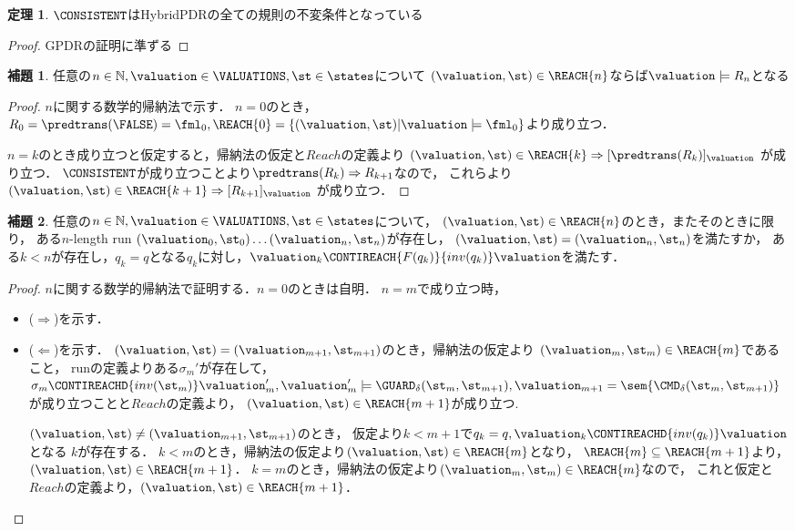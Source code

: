 \documentclass[a4paper]{jarticle}
\theoremstyle{definition}
\newtheorem{theorem}{定理}
\newtheorem{lemma}{補題}
\begin{document}
\begin{theorem}
  $\CONSISTENT$はHybridPDRの全ての規則の不変条件となっている
\end{theorem}

\begin{proof}
  GPDRの証明に準ずる
\end{proof}

\begin{lemma} \label{lem:1}
  任意の$n \in \mathbb{N}, \valuation \in \VALUATIONS, \st \in \states$について
  $(\valuation, \st) \in \REACH{n}$ならば$\valuation \models R_n$となる
\end{lemma}

\begin{proof}
  $n$に関する数学的帰納法で示す．
  $n=0$のとき，$R_0 = \predtrans(\FALSE) = \fml_0, \REACH{0} = \{(\valuation, \st) | \valuation \models \fml_0 \}$より成り立つ．

  $n=k$のとき成り立つと仮定すると，帰納法の仮定と$\mathit{Reach}$の定義より
  $(\valuation,\st) \in \REACH{k} \Rightarrow [\predtrans(R_k)]_{\valuation}$
  が成り立つ．
  $\CONSISTENT$が成り立つことより$\predtrans(R_k) \Rightarrow R_{k+1}$なので，
  これらより$(\valuation,\st) \in \REACH{k+1} \Rightarrow [R_{k+1}]_\valuation$
  が成り立つ．
\end{proof}

\begin{lemma} \label{lem:2}
  任意の$n \in \mathbb{N}, \valuation \in \VALUATIONS, \st \in \states$について，
  $(\valuation,\st) \in \REACH{n}$のとき，またそのときに限り，
  ある$n$-length run $(\valuation_0,\st_0) \dots (\valuation_n, \st_n)$が存在し，
  $(\valuation, \st) = (\valuation_n, \st_n)$を満たすか，
  ある$k < n$が存在し，$q_k = q$となる$q_k$に対し，$\valuation_k \CONTIREACH{F(q_k)}{ inv(q_k)} \valuation$を満たす．
\end{lemma}

\begin{proof}
  $n$に関する数学的帰納法で証明する．$n=0$のときは自明．
  $n=m$で成り立つ時，
  \begin{itemize}
  \item ($\Rightarrow$)を示す．
  \item ($\Leftarrow$)を示す．
    $(\valuation,\st) = (\valuation_{m+1}, \st_{m+1})$のとき，帰納法の仮定より
    $(\valuation_m,\st_m) \in \REACH{m}$であること，
    runの定義よりある$\sigma_m'$が存在して，$\sigma_m \CONTIREACHD{inv(\st_m)} \valuation_m', \valuation_m' \models \GUARD_\delta(\st_m,\st_{m+1}), \valuation_{m+1} = \sem{\CMD_\delta(\st_m,\st_{m+1})}$が成り立つことと$\mathit{Reach}$の定義より，
    $(\valuation,\st) \in \REACH{m+1}$が成り立つ.

    $(\valuation,\st) \not= (\valuation_{m+1},\st_{m+1})$のとき，
    仮定より$k<m+1$で$q_k=q,\valuation_k \CONTIREACHD{inv(q_k)} \valuation$となる
    $k$が存在する．
    $k < m$のとき，帰納法の仮定より$(\valuation,\st) \in \REACH{m}$となり，
    $\REACH{m} \subseteq \REACH{m+1}$より，$(\valuation,\st) \in \REACH{m+1}$．
    $k = m$のとき，帰納法の仮定より$(\valuation_m,\st_m) \in \REACH{m}$なので，
    これと仮定と$\mathit{Reach}$の定義より，$(\valuation, \st) \in \REACH{m+1}$．
  \end{itemize}
\end{proof}
\end{document}
